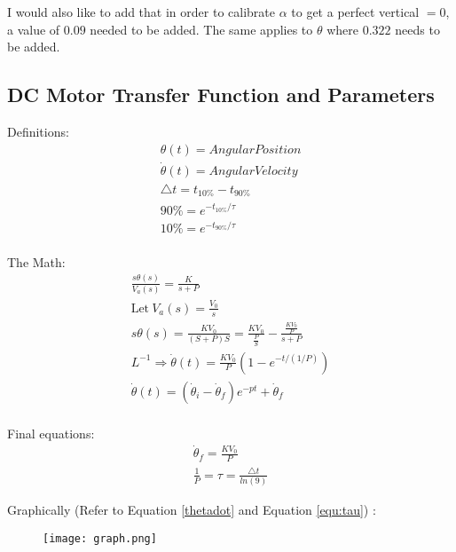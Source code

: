 \begin{CJK}
I would also like to add that in order to calibrate $\alpha$ to get a perfect vertical $= 0$, a value of $0.09$ needed to be added.  The same applies to $\theta$ where $0.322$ needs to be added.

\subsection{DC Motor Transfer Function and Parameters}

Definitions:
	\begin{align*}
		\theta(t) =  Angular Position \\
		\dot{\theta}(t) =  Angular Velocity \\
		\triangle t = t_{10\%} - t_{90\%} \\
		90\% = e^{-t_{10\%}/\tau} \\
		10\% = e^{-t_{90\%}/\tau} \\
	\end{align*}

The Math:
	\begin{align*}
		\frac{s\theta(s)}{V_{a}(s)} = \frac{K}{s+P} \\
		\mbox{Let}\ V_{a}(s) = \frac{V_{0}}{s} \\  %
		s\theta(s) = \frac{KV_{0}}{(S+P)S} = \frac{KV_{0}}{\frac{P}{S}} - \frac{\frac{KV_{0}}{P}}{s+P} \\
		L^{-1} \Rightarrow \dot{\theta}(t) = \frac{KV_{0}}{P}(1-e^{-t/(1/P)}) \\
		\dot{\theta}(t) = (\dot{\theta}_{i} - \dot{\theta}_{f})e^{-pt} + \dot{\theta}_{f} \\
	\end{align*}

Final equations:
	\begin{align}
		\label{thetadot}\dot{\theta}_{f} = \frac{KV_{0}}{P} \\
		\label{equ:tau}\frac{1}{P} = \tau = \frac{\triangle t}{ln(9)}
	\end{align}

Graphically (Refer to Equation \ref{thetadot} and Equation \ref{equ:tau}) :
	\begin{figure}[h]
		\begin{center}
			\texttt{[image: graph.png]}
		\end{center}
	\label{graph}
	\end{figure}


\end{CJK}
